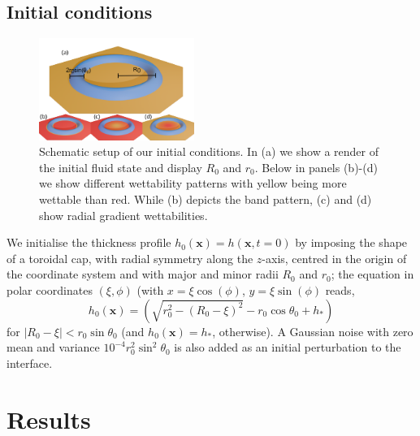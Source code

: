 \documentclass[%
 aip,
 amsmath,amssymb,
 reprint,%
]{revtex4-1}
\begin{document}
\subsection{Initial conditions}
\begin{figure}
\centering
  \includegraphics[width=0.45\textwidth]{Figure_1.pdf}
  \caption{Schematic setup of our initial conditions. In (a) we show a render of the initial fluid state and display $R_0$ and $r_0$. 
  Below in panels (b)-(d) we show different wettability patterns with yellow being more wettable than red.
  While (b) depicts the band pattern, (c) and (d) show radial gradient wettabilities.} 
  \label{fig:ringschema}
\end{figure}
We initialise the thickness profile $h_0(\mathbf{x})=h(\mathbf{x}, t=0)$ by imposing the shape of a toroidal cap, with radial symmetry along the $z$-axis, centred in the origin of the coordinate system and with major and minor radii $R_0$ and $r_0$; the equation in polar coordinates $(\xi, \phi)$ (with $x = \xi \cos(\phi)$, $y=\xi \sin(\phi)$ reads,
\begin{equation}\label{eq:torus}
    h_0(\mathbf{x})=\left(\sqrt{r_0^2 - \left(R_0-\xi\right)^2} - r_0\cos \theta_0 + h_{\ast}\right)
\end{equation}
for $|R_0-\xi|<r_0 \sin \theta_0$ (and $h_0(\mathbf{x})=h_{\ast}$, otherwise). 
A Gaussian noise with zero mean and variance $10^{-4}r_0^2 \sin^2\theta_0$ is also added as an initial perturbation to the interface.

\section{Results} \label{sec:results}
\end{document}
